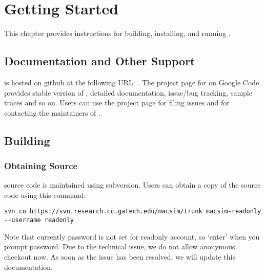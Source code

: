 

\chapter{Getting Started}


This chapter provides instructions for building, installing, and running \SIM.


\section{Documentation and Other Support}

\SIM is hosted on github at the following URL:
. 
The project page for \SIM on
Google Code provides stable version of \SIM, detailed documentation,
issue/bug tracking, sample traces and so on. Users can use the project
page for filing issues and for contacting the maintainers of \SIM.


\section{Building \SIM}
\label{sec:installation}


\subsection{Obtaining Source}

\SIM source code is maintained using subversion. Users can obtain a copy of the
source code using this command:

\begin{Verbatim}
svn co https://svn.research.cc.gatech.edu/macsim/trunk macsim-readonly --username readonly
\end{Verbatim}

\noindent
Note that currently password is not set for readonly account, so
`enter' when you prompt password. Due to the technical issue, we do
not allow anonymous checkout now. As soon as the issue has been
resolved, we will update this documentation.

